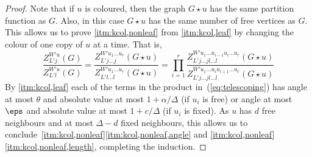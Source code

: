\begin{proof}
Note that if $u$ is coloured, then the graph $G \star u$ has the same partition function as $G$.
Also, in this case $G \star u$ has the same number of free vertices as $G$.
This allows us to prove \ref{itm:kcol,nonleaf} from \ref{itm:kcol,leaf} by changing the colour of one copy of $u$ at a time.
That is,
\begin{equation}
 \frac{Z_{L'j}^{W'u}(G)}{Z_{L'l}^{W'u}(G)} = \frac{Z_{L'j\ldots j}^{W'u_1\ldots u_r}(G\star u )}{Z_{L'l\ldots l}^{W'u_1\ldots u_r}(G\star u )} = \prod_{i=1}^r \frac{Z_{L'j\ldots j l \ldots l}^{W'u_1\ldots u_{i-1}u_i \ldots u_r}(G\star u )}{Z_{L'j\ldots j l \ldots l}^{W'u_1\ldots u_i u_{i+1} \ldots u_r}(G\star u )} \label{eq:telescoping}
\end{equation}
By \ref{itm:kcol,leaf} each of the terms in the product in~(\ref{eq:telescoping}) has angle at most $\theta$ and absolute value at most $1 +\alpha/\Delta$ (if $u_i$ is free) or angle at most $\eps$ and absolute value at most $1 +c/\Delta$ (if $u_i$ is fixed).
As $u$ has $d$ free neighbours and at most $\Delta -d$ fixed neighbours, this allows us to conclude~\ref{itm:kcol,nonleaf}\ref{itm:kcol,nonleaf,angle} and \ref{itm:kcol,nonleaf}\ref{itm:kcol,nonleaf,length}, completing the induction.
\end{proof}
%
